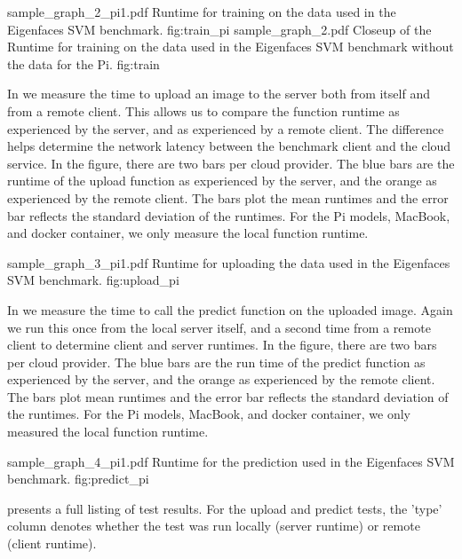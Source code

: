 \TwoFIGURES
    {sample_graph_2_pi1.pdf}
    {Runtime for training on the data used in the Eigenfaces SVM benchmark.}
    {fig:train_pi}
    {sample_graph_2.pdf}
    {Closeup of the Runtime for training on  the data used in the Eigenfaces SVM benchmark without the data for the Pi.}
    {fig:train}


In  we measure the time to upload an image to
the server both from itself and from a remote client. This allows us
to compare the function runtime as experienced by the server, and as
experienced by a remote client. The difference helps determine the
network latency between the benchmark client and the cloud service. In
the figure, there are two bars per cloud provider. The blue bars are
the runtime of the upload function as experienced by the server, and
the orange as experienced by the remote client. The bars plot the mean
runtimes and the error bar reflects the standard deviation of the
runtimes. For the Pi models, MacBook, and docker container, we only
measure the local function runtime.

\OneFIGURE
    {sample_graph_3_pi1.pdf}
    {Runtime for uploading the data used in the Eigenfaces SVM benchmark.}
    {fig:upload_pi}

In  we measure the time to call the predict
function on the uploaded image. Again we run this once from the local
server itself, and a second time from a remote client to determine
client and server runtimes. In the figure, there are two bars per
cloud provider. The blue bars are the run time of the predict function
as experienced by the server, and the orange as experienced by the
remote client. The bars plot mean runtimes and the error bar reflects
the standard deviation of the runtimes. For the Pi models, MacBook,
and docker container, we only measured the local function runtime.

\OneFIGURE
    {sample_graph_4_pi1.pdf}
    {Runtime for the prediction used in the Eigenfaces SVM benchmark.}
    {fig:predict_pi}

 presents a full listing of test results. For the upload
    and predict tests, the 'type' column denotes whether the test was
    run locally (server runtime) or remote (client runtime). 

